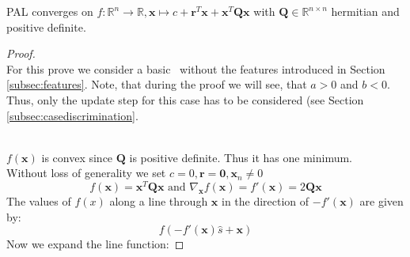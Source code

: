 
\begin{proposition_ap}
	PAL converges on  $f : \mathbb{R}^n \rightarrow \mathbb{R}, \mathbf{x} \mapsto c+\mathbf{r}^T\mathbf{x}+\mathbf{x}^T\mathbf{Q}\mathbf{x}$ with $\mathbf{Q}\in \mathbb{R}^{n\times n}$ hermitian and positive definite.
\end{proposition_ap}
\begin{proof}
	\quad
\\For this prove we consider a basic \pal\ without the features introduced in Section \ref{subsec:features}.
Note, that during the proof we will see, that $a>0$ and $b<0$. Thus, only the update step for this case has to be considered (see Section \ref{subsec:casediscrimination}.
	
 \quad \\ 
 $f(\mathbf{x})$ is convex since $\mathbf{Q}$ is positive definite. Thus it has one minimum.\\
 Without loss of generality we set $c=0,\mathbf{r}=\mathbf{0},\mathbf{x}_n \neq 0$ %
 \begin{equation}
 f(\mathbf{x})=\mathbf{x}^T\mathbf{Q}\mathbf{x} \text{ and }\nabla_{\mathbf{x}} f(\mathbf{x})= f'(\mathbf{x})=2\mathbf{Q}\mathbf{x}
   \end{equation}
The values of $f(x)$ along a line through $\mathbf{x}$ in the direction of $-f'(\mathbf{x})$ are given by:
 \begin{equation}
 f(-f'(\mathbf{x})\hat{s}+\mathbf{x})
   \end{equation}   
Now we expand the line function:

\end{proof}
